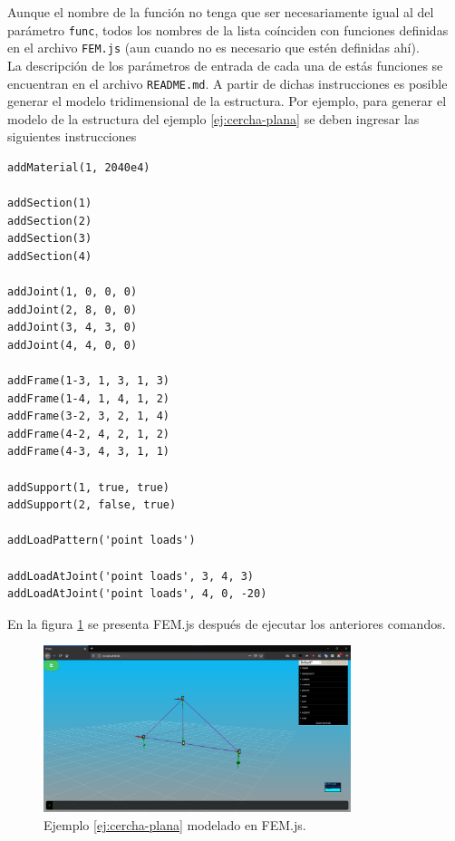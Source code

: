 Aunque el nombre de la función no tenga que ser necesariamente igual al del parámetro \verb|func|, todos los nombres de la lista coínciden con funciones definidas en el archivo \verb|FEM.js| (aun cuando no es necesario que estén definidas ahí).\\

La descripción de los parámetros de entrada de cada una de estás funciones se encuentran en el archivo \verb|README.md|. A partir de dichas instrucciones es posible generar el modelo tridimensional de la estructura. Por ejemplo, para generar el modelo de la estructura del ejemplo \ref{ej:cercha-plana} se deben ingresar las siguientes instrucciones\\
\begin{lstlisting}[language={}, frame=single]
addMaterial(1, 2040e4)

addSection(1)
addSection(2)
addSection(3)
addSection(4)

addJoint(1, 0, 0, 0)
addJoint(2, 8, 0, 0)
addJoint(3, 4, 3, 0)
addJoint(4, 4, 0, 0)

addFrame(1-3, 1, 3, 1, 3)
addFrame(1-4, 1, 4, 1, 2)
addFrame(3-2, 3, 2, 1, 4)
addFrame(4-2, 4, 2, 1, 2)
addFrame(4-3, 4, 3, 1, 1)

addSupport(1, true, true)
addSupport(2, false, true)

addLoadPattern('point loads')

addLoadAtJoint('point loads', 3, 4, 3)
addLoadAtJoint('point loads', 4, 0, -20)
\end{lstlisting}

En la figura \ref{fig:FEM.js-cercha-plana} se presenta FEM.js después de ejecutar los anteriores comandos.

\begin{figure}[ht]
  \centering
  \includegraphics[width=0.8\textwidth]{introduction/FEM.js-cercha-plana.png}
  \caption{Ejemplo \ref{ej:cercha-plana} modelado en FEM.js.}
  \label{fig:FEM.js-cercha-plana}
\end{figure}

